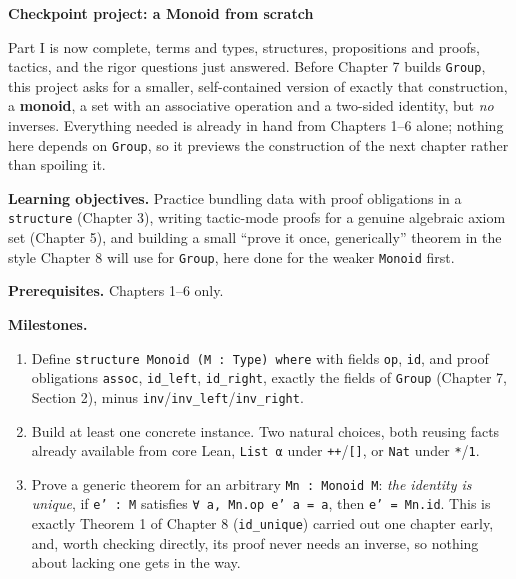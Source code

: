 \begin{pblproject}
\label{sec:06-rigor-check:06-checkpoint-project:1}
\textbf{\large Checkpoint project: a Monoid from scratch}\par\smallskip


Part I is now complete, terms and types, structures, propositions and proofs, tactics, and the rigor questions just answered. Before Chapter 7 builds \texttt{Group}, this project asks for a smaller, self-contained version of exactly that construction, a \textbf{monoid}, a set with an associative operation and a two-sided identity, but \emph{no} inverses. Everything needed is already in hand from Chapters 1--6 alone; nothing here depends on \texttt{Group}, so it previews the construction of the next chapter rather than spoiling it.

\textbf{Learning objectives.} Practice bundling data with proof obligations in a \texttt{structure} (Chapter 3), writing tactic-mode proofs for a genuine algebraic axiom set (Chapter 5), and building a small ``prove it once, generically'' theorem in the style Chapter 8 will use for \texttt{Group}, here done for the weaker \texttt{Monoid} first.

\textbf{Prerequisites.} Chapters 1--6 only.

\textbf{Milestones.}

\begin{enumerate}
\def\labelenumi{\arabic{enumi}.}
\tightlist
\item
  Define \texttt{structure Monoid (M : Type) where} with fields \texttt{op}, \texttt{id}, and proof obligations \texttt{assoc}, \texttt{id\_\allowbreak{}left}, \texttt{id\_\allowbreak{}right}, exactly the fields of \texttt{Group} (Chapter 7, Section 2), minus \texttt{inv}/\texttt{inv\_\allowbreak{}left}/\texttt{inv\_\allowbreak{}right}.
\item
  Build at least one concrete instance. Two natural choices, both reusing facts already available from core Lean, \texttt{List α} under \texttt{++}/\texttt{[]}, or \texttt{Nat} under \texttt{*}/\texttt{1}.
\item
  Prove a generic theorem for an arbitrary \texttt{Mn : Monoid M}: \emph{the identity is unique}, if \texttt{e' : M} satisfies \texttt{∀ a, Mn.op e' a = a}, then \texttt{e' = Mn.id}. This is exactly Theorem 1 of Chapter 8 (\texttt{id\_\allowbreak{}unique}) carried out one chapter early, and, worth checking directly, its proof never needs an inverse, so nothing about lacking one gets in the way.
\end{enumerate}


\end{pblproject}
